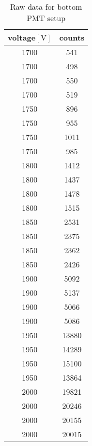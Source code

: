 \begin{table}[htpb]
	\centering
	\begin{tabular}{cc}
		\toprule
	voltage$[\si{\volt}]$ &  counts\\
	\midrule
\num{1700} & \num{ 541}\\
\num{1700} & \num{ 498}\\
\num{1700} & \num{ 550}\\
\num{1700} & \num{ 519}\\
\num{1750} & \num{ 896}\\
\num{1750} & \num{ 955}\\
\num{1750} & \num{ 1011}\\
\num{1750} & \num{ 985}\\
\num{1800} & \num{ 1412}\\
\num{1800} & \num{ 1437 }\\
\num{1800} & \num{ 1478}\\
\num{1800} & \num{ 1515}\\
\num{1850} & \num{ 2531}\\
\num{1850} & \num{ 2375}\\
\num{1850} & \num{ 2362}\\
\num{1850} & \num{ 2426}\\
\num{1900} & \num{ 5092}\\
\num{1900} & \num{ 5137}\\
\num{1900} & \num{ 5066}\\
\num{1900} & \num{ 5086}\\
\num{1950} & \num{ 13880}\\
\num{1950} & \num{ 14289}\\
\num{1950} & \num{ 15100}\\
\num{1950} & \num{ 13864}\\
\num{2000} & \num{ 19821}\\
\num{2000} & \num{ 20246}\\
\num{2000} & \num{ 20155}\\
\num{2000} & \num{ 20015}\\
\bottomrule
	\end{tabular}
	\caption{Raw data for bottom PMT setup}
	\label{tab:raw_bot}
\end{table}

